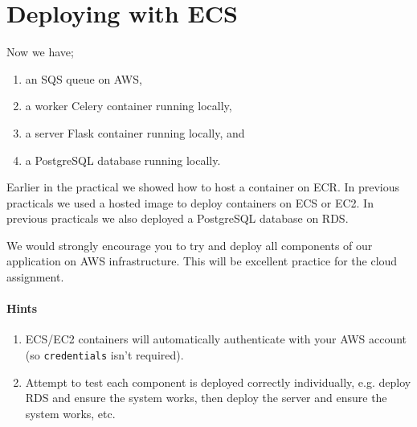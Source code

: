 \documentclass{csse4400}
\begin{document}
\section{Deploying with ECS}

Now we have;
\begin{enumerate}
    \item an SQS queue on AWS,
    \item a worker Celery container running locally,
    \item a server Flask container running locally, and
    \item a PostgreSQL database running locally.
\end{enumerate}

Earlier in the practical we showed how to host a container on ECR.
In previous practicals we used a hosted image to deploy containers on ECS or EC2.
In previous practicals we also deployed a PostgreSQL database on RDS.

We would strongly encourage you to try and deploy all components of our application on AWS infrastructure.
This will be excellent practice for the cloud assignment.

\paragraph{Hints}
\begin{enumerate}
    \item ECS/EC2 containers will automatically authenticate with your AWS account (so \texttt{credentials} isn't required).
    \item Attempt to test each component is deployed correctly individually, e.g. deploy RDS and ensure the system works, then deploy the server and ensure the system works, etc.
\end{enumerate}



\end{document}
